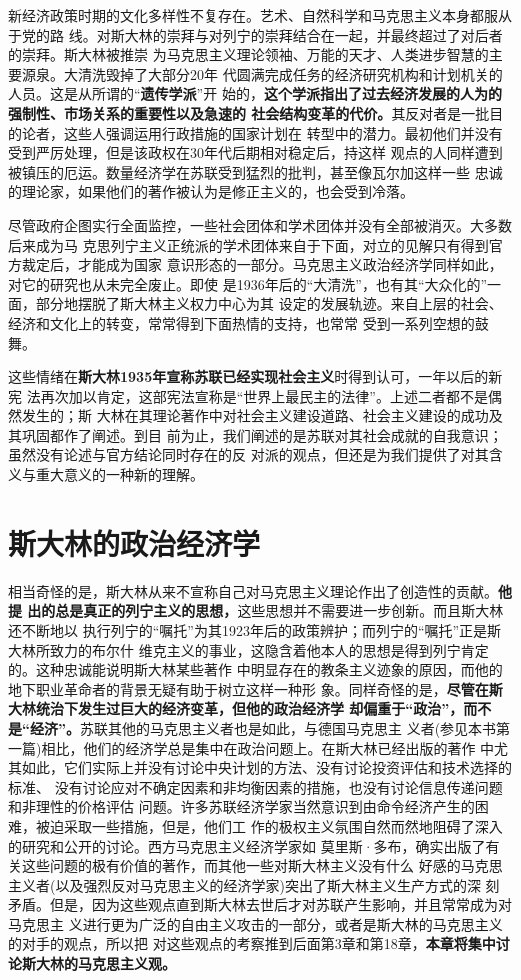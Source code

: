 新经济政策时期的文化多样性不复存在。艺术、自然科学和马克思主义本身都服从于党的路
线。对斯大林的崇拜与对列宁的崇拜结合在一起，并最终超过了对后者的崇拜。斯大林被推崇
为马克思主义理论领袖、万能的天才、人类进步智慧的主要源泉。大清洗毁掉了大部分20年
代圆满完成任务的经济研究机构和计划机关的人员。这是从所谓的“\textbf{遗传学派}”开
始的，\textbf{这个学派指出了过去经济发展的人为的强制性、市场关系的重要性以及急速的
  社会结构变革的代价。}其反对者是一批目的论者，这些人强调运用行政措施的国家计划在
转型中的潜力。最初他们并没有受到严厉处理，但是该政权在30年代后期相对稳定后，持这样
观点的人同样遭到被镇压的厄运。数量经济学在苏联受到猛烈的批判，甚至像瓦尔加这样一些
忠诚的理论家，如果他们的著作被认为是修正主义的，也会受到冷落。

尽管政府企图实行全面监控，一些社会团体和学术团体并没有全部被消灭。大多数后来成为马
克思列宁主义正统派的学术团体来自于下面，对立的见解只有得到官方裁定后，才能成为国家
意识形态的一部分。马克思主义政治经济学同样如此，对它的研究也从未完全废止。即使
是1936年后的“大清洗”，也有其“大众化的”一面，部分地摆脱了斯大林主义权力中心为其
设定的发展轨迹。来自上层的社会、经济和文化上的转变，常常得到下面热情的支持，也常常
受到一系列空想的鼓舞。

这些情绪在\textbf{斯大林1935年宣称苏联已经实现社会主义}时得到认可，一年以后的新宪
法再次加以肯定，这部宪法宣称是“世界上最民主的法律”。上述二者都不是偶然发生的；斯
大林在其理论著作中对社会主义建设道路、社会主义建设的成功及其巩固都作了阐述。到目
前为止，我们阐述的是苏联对其社会成就的自我意识；虽然没有论述与官方结论同时存在的反
对派的观点，但还是为我们提供了对其含义与重大意义的一种新的理解。
\vfill
\section{斯大林的政治经济学}
相当奇怪的是，斯大林从来不宣称自己对马克思主义理论作出了创造性的贡献。\textbf{他提
  出的总是真正的列宁主义的思想，}这些思想并不需要进一步创新。而且斯大林还不断地以
执行列宁的“嘱托”为其1923年后的政策辨护；而列宁的“嘱托”正是斯大林所致力的布尔什
维克主义的事业，这隐含着他本人的思想是得到列宁肯定的。这种忠诚能说明斯大林某些著作
中明显存在的教条主义迹象的原因，而他的地下职业革命者的背景无疑有助于树立这样一种形
象。同样奇怪的是，\textbf{尽管在斯大林统治下发生过巨大的经济变革，但他的政治经济学
  却偏重于“政治”，而不是“经济”。}苏联其他的马克思主义者也是如此，与德国马克思主
义者(参见本书第一篇)相比，他们的经济学总是集中在政治问题上。在斯大林已经出版的著作
中尤其如此，它们实际上并没有讨论中央计划的方法、没有讨论投资评估和技术选择的标准、
没有讨论应对不确定因素和非均衡因素的措施，也没有讨论信息传递问题和非理性的价格评估
问题。许多苏联经济学家当然意识到由命令经济产生的困难，被迫采取一些措施，但是，他们工
作的极权主义氛围自然而然地阻碍了深入的研究和公开的讨论。西方马克思主义经济学家如
莫里斯·多布，确实出版了有关这些问题的极有价值的著作，而其他一些对斯大林主义没有什么
好感的马克思主义者(以及强烈反对马克思主义的经济学家)突出了斯大林主义生产方式的深
刻矛盾。但是，因为这些观点直到斯大林去世后才对苏联产生影响，并且常常成为对马克思主
义进行更为广泛的自由主义攻击的一部分，或者是斯大林的马克思主义的对手的观点，所以把
对这些观点的考察推到后面第3章和第18章，\textbf{本章将集中讨论斯大林的马克思主义观。}

